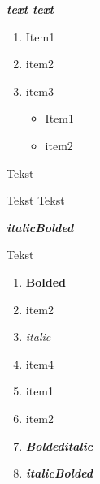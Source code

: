 \documentclass{report}
\begin{document}
    \underline{
        \textit{
            \textbf{
                text text
            }
        }
    }
    
    \begin{enumerate}
        \item Item1
        \item item2
        \item item3 \begin{itemize}
                \item Item1
                \item item2
            \end{itemize}
    \end{enumerate}

    Tekst

    Tekst
    Tekst

    \textit{\textbf{italicBolded}} 

    Tekst
    \begin{enumerate}
        \item \textbf{Bolded}
        \item item2
        \item \textit{italic}
        \item item4
        \item item1
        \item item2
        \item \textbf{\textit{Boldeditalic}}
        \item \textit{\textbf{italicBolded}}
    \end{enumerate}
\end{document}

